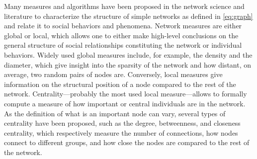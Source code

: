 
Many measures and algorithms have been proposed in the network science and \sna literature to characterize the structure of simple networks as defined in \autoref{eq:graph} and relate it to social behaviors and phenomena\cite{scottSocialNetworkAnalysis1988, tabassumSocialNetworkAnalysis2018}.
Network measures are either global or local, which allows one to either make high-level conclusions on the general structure of social relationships constituting the network or individual behaviors.
Widely used global measures include, for example, the density and the diameter, which give insight into the sparsity of the network and how distant, on average, two random pairs of nodes are.
Conversely, local measures give information on the structural position of a node compared to the rest of the network.
Centrality---probably the most used local measure---allows to formally compute a measure of how important or central individuals are in the network\cite{newmanNetworks2018}.
As the definition of what is an important node can vary, several types of centrality have been proposed, such as the degree, betweenness, and closeness centrality, which respectively measure the number of connections, how nodes connect to different groups, and how close the nodes are compared to the rest of the network.

